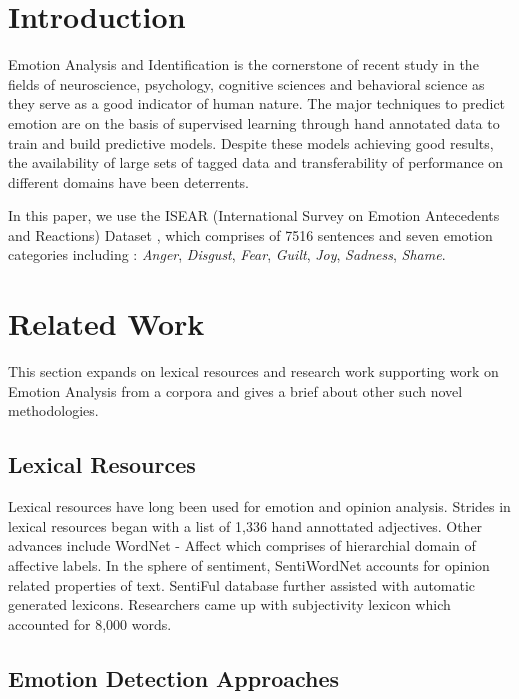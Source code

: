 \documentclass[conference]{IEEEtran}
\numberwithin{equation}{section}
\numberwithin{figure}{section}
\numberwithin{table}{section}
\begin{document}
\section{Introduction}
Emotion Analysis and Identification is the cornerstone of recent study in the fields of neuroscience, psychology, cognitive sciences and behavioral science as they serve as a good indicator of human nature. The major techniques to predict emotion are on the basis of supervised learning through hand annotated data to train and build predictive models. Despite these models achieving good results, the availability of large sets of tagged data and transferability of performance on different domains have been deterrents. 

In this paper, we use the ISEAR (International Survey on Emotion Antecedents and Reactions) Dataset \cite{iseardataset}, which comprises of 7516 sentences and seven emotion categories including : \textit{Anger}, \textit{Disgust}, \textit{Fear}, \textit{Guilt}, \textit{Joy}, \textit{Sadness}, \textit{Shame}. 

\section{Related Work}\label{sec:page-layout}
This section expands on lexical resources and research work supporting work on Emotion Analysis from a corpora and gives a brief about other such novel methodologies. 


\subsection{Lexical Resources}\label{sec:formatting}
Lexical resources have long been used for emotion and opinion analysis. Strides in lexical resources began with a list of 1,336 hand annottated adjectives. Other advances include WordNet - Affect which comprises of hierarchial domain of affective labels. In the sphere of sentiment, SentiWordNet \cite{sentiword} accounts for opinion related properties of text. SentiFul database further assisted with automatic generated lexicons. Researchers came up with subjectivity lexicon which accounted for 8,000 words. 




\subsection{Emotion Detection Approaches
}\label{sec:formatting-text}
\end{document}
